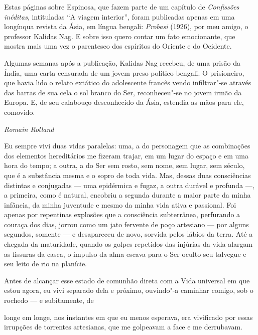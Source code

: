 \thispagestyle{empty}

Estas páginas sobre Espinosa, que fazem parte de um capítulo de
\emph{Confissões inéditas}, intituladas ``A viagem interior'', foram
publicadas apenas em uma longínqua revista da Ásia, em língua bengali:
\emph{Probasi} (1926), por meu amigo, o professor Kalidas Nag. E sobre
isso quero contar um fato emocionante, que mostra mais uma vez o
parentesco dos espíritos do Oriente e do Ocidente.

Algumas semanas após a publicação, Kalidas Nag recebeu, de uma prisão da
Índia, uma carta censurada de um jovem preso político bengali. O
prisioneiro, que havia lido o relato extático do adolescente francês
vendo infiltrar"-se através das barras de sua cela o sol branco do Ser,
reconheceu"-se no jovem irmão da Europa. E, de seu calabouço desconhecido
da Ásia, estendia as mãos para ele, comovido.

\begin{flushright}
\emph{Romain Rolland}
\end{flushright}

\pagebreak
\thispagestyle{empty}
\movetooddpage

Eu sempre vivi duas vidas paralelas: uma, a do personagem que as
combinações dos elementos hereditários me fizeram trajar, em um lugar do
espaço e em uma hora do tempo; a outra, a do Ser sem rosto, sem nome,
sem lugar, sem século, que é a substância mesma e o sopro de toda vida.
Mas, dessas duas consciências distintas e conjugadas --- uma epidérmica e
fugaz, a outra durável e profunda ---, a primeira, como é natural,
encobriu a segunda durante a maior parte da minha infância, da minha
juventude e mesmo da minha vida ativa e passional. Foi apenas por
repentinas explosões que a consciência subterrânea, perfurando a couraça
dos dias, jorrou como um jato fervente de poço artesiano --- por alguns
segundos, somente --- e desapareceu de novo, sorvida pelos lábios da
terra. Até a chegada da maturidade, quando os golpes repetidos das
injúrias da vida alargam as fissuras da casca, o impulso da alma escava
para o Ser oculto seu talvegue e seu leito de rio na planície.

Antes de alcançar esse estado de comunhão direta com a Vida universal em
que estou agora, eu vivi separado dela e próximo, ouvindo"-a caminhar
comigo, sob o rochedo --- e subitamente, de \linebreak

\quebra

\noindent{}longe em longe, nos instantes
em que eu menos esperava, era vivificado por essas irrupções de
torrentes artesianas, que me golpeavam a face e me derrubavam.


